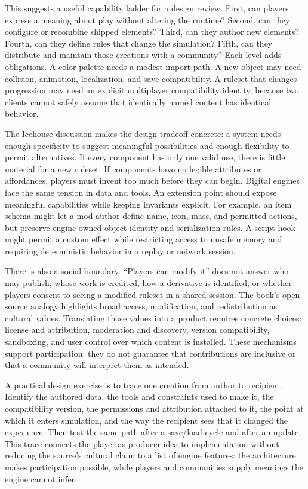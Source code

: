 This suggests a useful capability ladder for a design review. First, can players express a meaning about play without altering the runtime? Second, can they configure or recombine shipped elements? Third, can they author new elements? Fourth, can they define rules that change the simulation? Fifth, can they distribute and maintain those creations with a community? Each level adds obligations. A color palette needs a modest import path. A new object may need collision, animation, localization, and save compatibility. A ruleset that changes progression may need an explicit multiplayer compatibility identity, because two clients cannot safely assume that identically named content has identical behavior.

The Icehouse discussion makes the design tradeoff concrete: a system needs enough specificity to suggest meaningful possibilities and enough flexibility to permit alternatives. If every component has only one valid use, there is little material for a new ruleset. If components have no legible attributes or affordances, players must invent too much before they can begin. Digital engines face the same tension in data and tools. An extension point should expose meaningful capabilities while keeping invariants explicit. For example, an item schema might let a mod author define name, icon, mass, and permitted actions, but preserve engine-owned object identity and serialization rules. A script hook might permit a custom effect while restricting access to unsafe memory and requiring deterministic behavior in a replay or network session.

There is also a social boundary. ``Players can modify it'' does not answer who may publish, whose work is credited, how a derivative is identified, or whether players consent to seeing a modified ruleset in a shared session. The book's open-source analogy highlights broad access, modification, and redistribution as cultural values. Translating those values into a product requires concrete choices: license and attribution, moderation and discovery, version compatibility, sandboxing, and user control over which content is installed. These mechanisms support participation; they do not guarantee that contributions are inclusive or that a community will interpret them as intended.

A practical design exercise is to trace one creation from author to recipient. Identify the authored data, the tools and constraints used to make it, the compatibility version, the permissions and attribution attached to it, the point at which it enters simulation, and the way the recipient sees that it changed the experience. Then test the same path after a save/load cycle and after an update. This trace connects the player-as-producer idea to implementation without reducing the source's cultural claim to a list of engine features: the architecture makes participation possible, while players and communities supply meanings the engine cannot infer.

